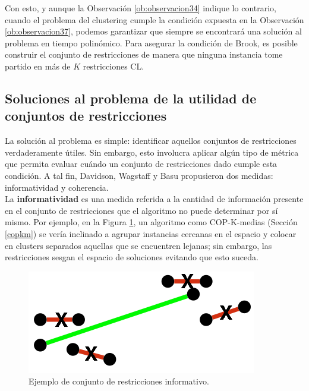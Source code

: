 Con esto, y aunque la Observación \ref{ob:observacion34} indique lo contrario, cuando el problema del clustering cumple la condición expuesta en la Observación \ref{ob:observacion37}, podemos garantizar que siempre se encontrará una solución al problema en tiempo polinómico. Para asegurar la condición de Brook, es posible construir el conjunto de restricciones de manera que ninguna instancia tome partido en más de $K$ restricciones \acf{CL}. \cite{davidson2006identifying}

\subsection{Soluciones al problema de la utilidad de conjuntos de restricciones}

La solución al problema es simple: identificar aquellos conjuntos de restricciones verdaderamente útiles. Sin embargo, esto involucra aplicar algún tipo de métrica que permita evaluar cuándo un conjunto de restricciones dado cumple esta condición. A tal fin, Davidson, Wagstaff y Basu propusieron dos medidas: informatividad y coherencia.\\

La \textbf{informatividad} es una medida referida a la cantidad de información presente en el conjunto de restricciones que el algoritmo no puede determinar por sí mismo. Por ejemplo, en la Figura \ref{fig:figure16}, un algoritmo como COP-K-medias (Sección \ref{copkm}) se vería inclinado a agrupar instancias cercanas en el espacio y colocar en clusters separados aquellas que se encuentren lejanas; sin embargo, las restricciones sesgan el espacio de soluciones evitando que esto suceda. 

\begin{figure}[!h]
	\centering
	\includegraphics[scale=0.4]{gfx/ConstClust/Inform/Inform} 
	\caption[Ejemplo de conjunto de restricciones informativo.]{Ejemplo de conjunto de restricciones informativo. \cite{davidson2007survey}}\label{fig:figure16}
\end{figure}


